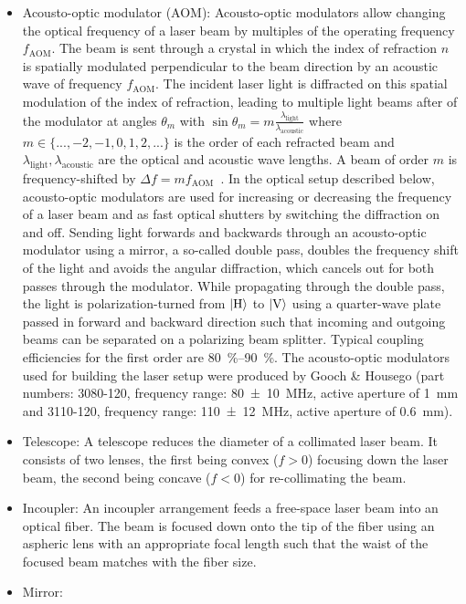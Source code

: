 \begin{itemize}
    \item Acousto-optic modulator (AOM): Acousto-optic modulators allow changing the optical frequency of a laser beam by multiples of the operating frequency $f_\text{AOM}$. The beam is sent through a crystal in which the index of refraction $n$ is spatially modulated perpendicular to the beam direction by an acoustic wave of frequency $f_\text{AOM}$. The incident laser light is diffracted on this spatial modulation of the index of refraction, leading to multiple light beams after of the modulator at angles $\theta_m$ with $\sin \theta_m = m\frac{\lambda_\text{light}}{\lambda_\text{acoustic}}$ where $m \in \{..., -2, -1, 0, 1, 2, ...\}$ is the order of each refracted beam and $\lambda_\text{light}, \lambda_\text{acoustic}$ are the optical and acoustic wave lengths. A beam of order $m$ is frequency-shifted by $\Delta f = mf_\text{AOM}$~\cite{hunsperger_acousto-optic_2002}. In the optical setup described below, acousto-optic modulators are used for increasing or decreasing the frequency of a laser beam and as fast optical shutters by switching the diffraction on and off. Sending light forwards and backwards through an acousto-optic modulator using a mirror, a so-called double pass, doubles the frequency shift of the light and avoids the angular diffraction, which cancels out for both passes through the modulator. While propagating through the double pass, the light is polarization-turned from $\Ket{\text{H}}$ to $\Ket{\text{V}}$ using a quarter-wave plate passed in forward and backward direction such that incoming and outgoing beams can be separated on a polarizing beam splitter. Typical coupling efficiencies for the first order are \SIrange[]{80}{90}{\percent}. The acousto-optic modulators used for building the laser setup were produced by Gooch \& Housego (part numbers: 3080-120, frequency range: \SI{80(10)}{\mega\hertz}, active aperture of \SI{1}{\milli\meter} and 3110-120, frequency range: \SI{110(12)}{\mega\hertz}, active aperture of \SI{0.6}{\milli\meter}).
    \item Telescope: A telescope reduces the diameter of a collimated laser beam. It consists of two lenses, the first being convex ($f > 0$) focusing down the laser beam, the second being concave ($f < 0$) for re-collimating the beam.
    \item Incoupler: An incoupler arrangement feeds a free-space laser beam into an optical fiber. The beam is focused down onto the tip of the fiber using an aspheric lens with an appropriate focal length such that the waist of the focused beam matches with the fiber size.
    \item Mirror: 
\end{itemize}

